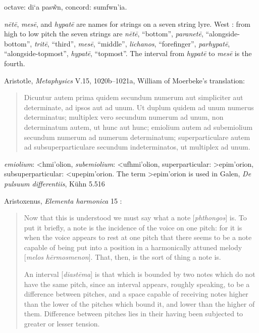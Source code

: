 \documentclass{article}
\newcommand{\textgreek}[1]{\begingroup\fontencoding{LGR}\selectfont#1\endgroup}
\theoremstyle{definition}
\begin{document}
octave: \textgreek{di`a pas\~wn},
concord: \textgreek{sumfwn'ia}.

{\em n\={e}t\={e}}, {\em mes\={e}}, and {\em hypat\={e}} are names for strings on a seven string lyre.
West \cite[p.~219]{west}: from high to low pitch the seven strings are
{\em n\={e}t\={e}}, ``bottom'',
{\em paranet\={e}}, ``alongside-bottom'',
{\em trit\={e}}, ``third'',
{\em mes\={e}}, ``middle'',
{\em lichanos}, ``forefinger'',
{\em parhypat\={e}}, ``alongside-topmost'',
{\em hypat\={e}}, ``topmost''.
The interval from {\em hypat\={e}} to {\em mes\={e}} is the fourth.

Aristotle, {\em Metaphysics} V.15, 1020b--1021a, William of Moerbeke's translation:

\begin{quote}
Dicuntur autem prima quidem secundum numerum aut simpliciter aut determinate, ad ipsos aut ad unum. Ut duplum quidem ad unum numerus determinatus; multiplex vero secundum numerum ad unum, non determinatum autem, ut hunc aut hunc; emiolium autem ad subemiolium secundum numerum ad numerum determinatum; superparticulare autem ad subsuperparticulare secundum indeterminatos, ut multiplex ad unum.
\end{quote}

{\em emiolium}: \textgreek{<hmi'olion},
{\em subemiolium}: \textgreek{<ufhmi'olion},
superparticular: \textgreek{>epim'orion},
subsuperparticular: \textgreek{<upepim'orion}.
The term \textgreek{>epim'orion} is used in Galen, {\em De pulsuum differentiis}, K\"uhn 5.516 \cite{galeni}

Aristoxenus, {\em Elementa harmonica} 15 \cite[p.~136]{barker}:

\begin{quote}
Now that this is understood we must say what a note [{\em phthongos}] is. To
put it briefly, a note is the incidence of the voice on one pitch: for it is when
the voice appears to rest at one pitch that there seems to be a note capable
of being put into a position in a harmonically attuned melody [{\em melos
h\={e}rmosmenon}]. That, then, is the sort of thing a note is.

An interval [{\em diast\={e}ma}] is that which is bounded by two notes which do not
have the same pitch, since an interval appears, roughly speaking, to be a
difference between pitches, and a space capable of receiving notes higher than
the lower of the pitches which bound it, and lower than the higher of them.
Difference between pitches lies in their having been subjected to greater or
lesser tension.
\end{quote}
\end{document}
